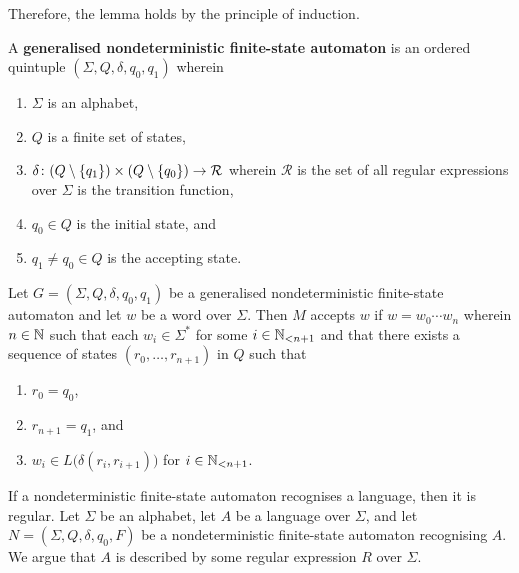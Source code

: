     Therefore, the lemma holds by the principle of induction.
\Epr

\Bdf
    A {\bf generalised nondeterministic finite-state automaton} is an ordered
    quintuple \((\Sigma, Q, \delta, q_0, q_1)\) wherein
    \begin{enumerate}
        \item \(\Sigma\) is an alphabet,
        \item \(Q\) is a finite set of states,
        \item \(\map{\delta}{(Q \setminus \set{q_1}) \times (Q \setminus
        \set{q_0})}{\mathcal{R}}\) wherein \(\mathcal{R}\) is the set of all
        regular expressions over \(\Sigma\) is the transition function,
        \item \(q_0 \in Q\) is the initial state, and
        \item \(q_1 \neq q_0 \in Q\) is the accepting state.
    \end{enumerate}
\Edf

Let \(G = (\Sigma, Q, \delta, q_0, q_1)\) be a generalised nondeterministic
finite-state automaton and let \(w\) be a word over \(\Sigma\). Then \(M\)
accepts \(w\) if \(w = w_0 \cdots w_n\) wherein \(n \in \setnat\) such that each
\(w_i \in \Sigma^*\) for some \(i \in \Nln[n + 1]\) and that there exists a
sequence of states \((r_0, \ldots, r_{n + 1})\) in \(Q\) such that
\begin{enumerate}
    \item \(r_0 = q_0\),
    \item \(r_{n + 1} = q_1\), and
    \item \(w_i \in L\big(\delta(r_i, r_{i + 1})\big)\) for \(i \in \Nln[n +
    1]\).
\end{enumerate}

\Blm
    \label{lem2}
    If a nondeterministic finite-state automaton recognises a language, then it
    is regular.
\Elm
\Bpr
    Let \(\Sigma\) be an alphabet, let \(A\) be a language over \(\Sigma\), and
    let \(N = (\Sigma, Q, \delta, q_0, F)\) be a nondeterministic finite-state
    automaton recognising \(A\). We argue that \(A\) is described by some
    regular expression \(R\) over \(\Sigma\).

